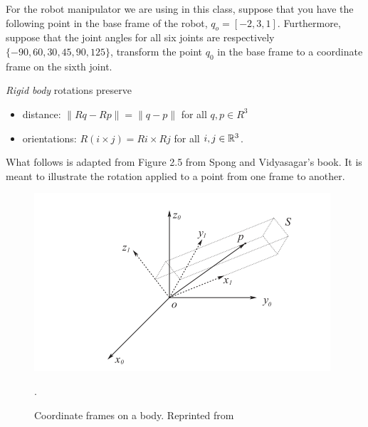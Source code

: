 \noindent 
\begin{homework}
	For the robot manipulator we are using in this class, suppose that you have the following point in the base frame of the robot, $q_o = [-2, 3, 1]$. Furthermore, suppose that the joint angles for all six joints are respectively $\{-90, 60, 30, 45, 90, 125 \}$, transform the point $q_0$ in the base frame to a coordinate frame on the sixth joint.
\end{homework}

%
\begin{tcolorbox}[title=Properties of Rigid Body Rotation Matrices]
	\textit{Rigid body} rotations preserve
	\begin{itemize}
		\item distance: $\|Rq - Rp\| = \|q-p\|$ for all $q, p \in R^3$
		\item orientations: $R(i \times j) = Ri \times Rj$ for all $i, j \in \mathbb{R}^3$.
	\end{itemize}
\end{tcolorbox}

What follows is adapted from Figure 2.5 from Spong and Vidyasagar's book. It is meant to illustrate the rotation applied to a point from one frame to another.
%
\begin{figure}[tb!]
	\centering
	\includegraphics[width=.8\columnwidth]{figures/point_transform.png}
	\caption{Coordinate frames on a body. Reprinted from \cite{SpongBook}}.
	\label{fig:point_transform}
\end{figure}

